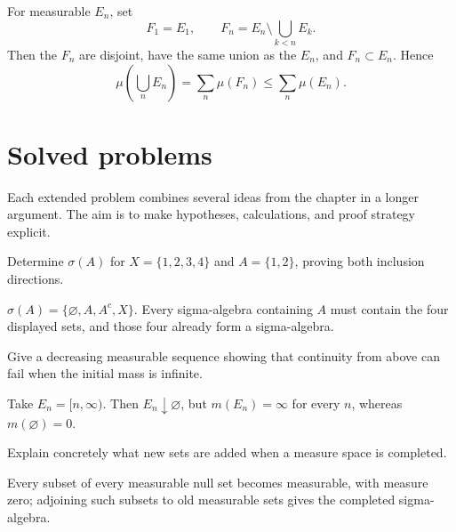 \begin{example}\label{ex:iii01-worked-04}
For measurable \(E_n\), set
\[
F_1=E_1,\qquad F_n=E_n\setminus\bigcup_{k<n}E_k.
\]
Then the \(F_n\) are disjoint, have the same union as the \(E_n\), and
\(F_n\subset E_n\). Hence
\[
\mu\!\left(\bigcup_nE_n\right)=\sum_n\mu(F_n)\le\sum_n\mu(E_n).
\]
\end{example}

\section{Solved problems}
Each extended problem combines several ideas from the chapter in a longer argument. The aim is to make hypotheses, calculations, and proof strategy explicit.

\begin{problem}\label{prob:iii01-problem-01}
Determine \(\sigma(A)\) for \(X=\{1,2,3,4\}\) and \(A=\{1,2\}\), proving both inclusion directions.
\end{problem}
\begin{solution}
\(\sigma(A)=\{\varnothing,A,A^c,X\}\). Every sigma-algebra containing \(A\)
must contain the four displayed sets, and those four already form a sigma-algebra.
\end{solution}

\begin{problem}\label{prob:iii01-problem-02}
Give a decreasing measurable sequence showing that continuity from above can fail when the initial mass is infinite.
\end{problem}
\begin{solution}
Take \(E_n=[n,\infty)\). Then \(E_n\downarrow\varnothing\), but
\(m(E_n)=\infty\) for every \(n\), whereas \(m(\varnothing)=0\).
\end{solution}

\begin{problem}\label{prob:iii01-problem-03}
Explain concretely what new sets are added when a measure space is completed.
\end{problem}
\begin{solution}
Every subset of every measurable null set becomes measurable, with measure
zero; adjoining such subsets to old measurable sets gives the completed
sigma-algebra.
\end{solution}

